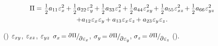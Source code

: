 {\nopagebreak\vspace{-0.25em}\begin{multline*}
\potentialenergydensity =^{\mathstrut^{\mathstrut}}
\smalldisplaystyleonehalf a_{11} \infinitesimaldeformationcomponents{x}^2 \hspace{-0.1ex} +
\smalldisplaystyleonehalf a_{22} \infinitesimaldeformationcomponents{y}^2 \hspace{-0.1ex} +
\smalldisplaystyleonehalf a_{33} \infinitesimaldeformationcomponents{z}^2 \hspace{-0.1ex} +
\smalldisplaystyleonehalf a_{44} \infinitesimaldeformationcomponents{xy}^2 \hspace{-0.2ex} +
\smalldisplaystyleonehalf a_{55} \infinitesimaldeformationcomponents{xz}^2 \hspace{-0.2ex} +
\smalldisplaystyleonehalf a_{66} \infinitesimaldeformationcomponents{yz}^2
\\[-0.1em]
%
+ a_{12} \infinitesimaldeformationcomponents{x} \infinitesimaldeformationcomponents{y} \hspace{-0.2ex}
+ a_{13} \infinitesimaldeformationcomponents{x} \infinitesimaldeformationcomponents{z} \hspace{-0.2ex}
+ a_{23} \infinitesimaldeformationcomponents{y} \infinitesimaldeformationcomponents{z}
\hspace{.1ex}
.
\end{multline*}

\en{,}
~()
$\hspace{.123ex}\varepsilon_{xy}$,
$\hspace{.123ex}\varepsilon_{xz}$,
$\hspace{.123ex}\varepsilon_{yz}$
${
   \sigma_x \hspace{-0.25ex}
   = \raisemath{.16em} {
      \scalebox{.88}{$ \partial \hspace{.1ex} \potentialenergydensity $}
   }
   \hspace{-0.1ex} / \hspace{-0.2ex}
   \raisemath{-0.32em} {
      \scalebox{.88}{$ \partial \infinitesimaldeformationcomponents{x} $}
   }
}$,
${
   \sigma_y \hspace{-0.25ex}
   = \raisemath{.16em} {
      \scalebox{.88}{$ \partial \hspace{.1ex} \potentialenergydensity $}
}
\hspace{-0.1ex} / \hspace{-0.2ex}
\raisemath{-0.32em} {
   \scalebox{.88}{$ \partial \infinitesimaldeformationcomponents{y} $}
}
}$,
${\sigma_z \hspace{-0.25ex}
   =
   \raisemath{.16em} {
      \scalebox{.88}{$ \partial \hspace{.1ex} \potentialenergydensity $}
   }
   \hspace{-0.1ex} / \hspace{-0.2ex} \raisemath{-0.32em} {
      \scalebox{.88}{$ \partial \infinitesimaldeformationcomponents{z} $}
  }
}$ ().

}
